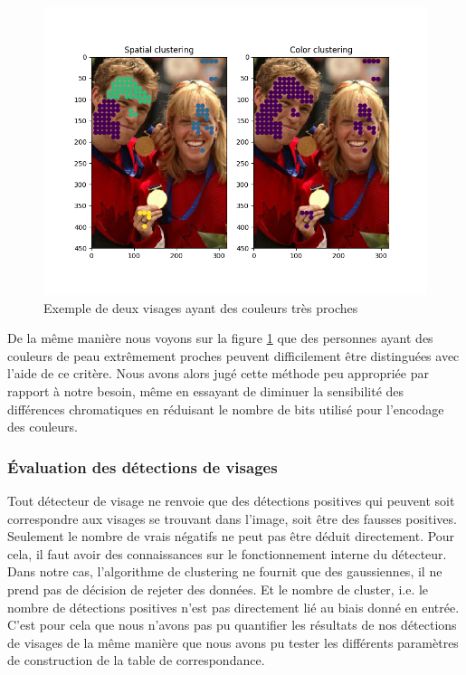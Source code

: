 \documentclass[a4paper,11pt]{article}
\begin{document}
\begin{figure}[H]
\begin{center}
    \includegraphics[scale=0.5]{color_clustering_close.png}
    \caption{Exemple de deux visages ayant des couleurs très proches} 
    \label{fig:color_clustering_close}
\end{center}
\end{figure}
De la même manière nous voyons sur la figure \ref{fig:color_clustering_close} que des personnes ayant des couleurs de peau extrêmement proches peuvent difficilement être distinguées avec l'aide de ce critère.
\newline
Nous avons alors jugé cette méthode peu appropriée par rapport à notre besoin, même en essayant de diminuer la sensibilité des différences chromatiques en réduisant le nombre de bits utilisé pour l'encodage des couleurs.
\subsubsection{Évaluation des détections de visages}
Tout détecteur de visage ne renvoie que des détections positives qui peuvent soit correspondre aux visages se trouvant dans l'image, soit être des fausses positives.
Seulement le nombre de vrais négatifs ne peut pas être déduit directement.
Pour cela, il faut avoir des connaissances sur le fonctionnement interne du détecteur.
\newline
Dans notre cas, l'algorithme de clustering ne fournit que des gaussiennes, il ne prend pas de décision de rejeter des données.
Et le nombre de cluster, i.e. le nombre de détections positives n'est pas directement lié au biais donné en entrée.
C'est pour cela que nous n'avons pas pu quantifier les résultats de nos détections de visages de la même manière que nous avons pu tester les différents paramètres de construction de la table de correspondance.
\end{document}
